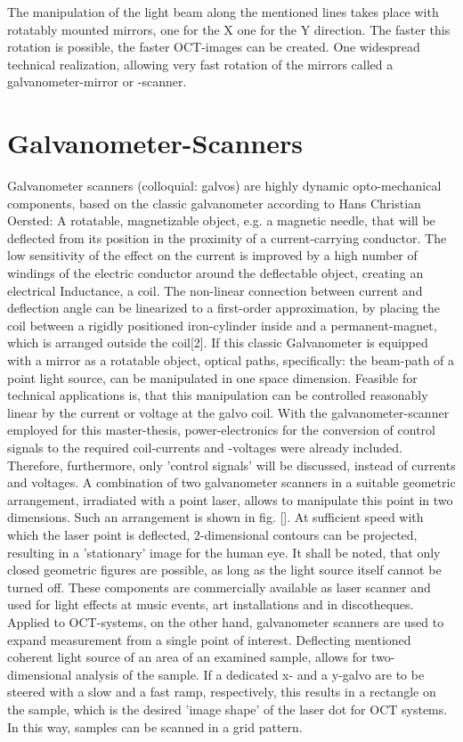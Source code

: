 The manipulation of the light beam along the mentioned lines takes place with rotatably mounted mirrors, one for the X one for the Y direction. The faster this rotation is possible, the faster OCT-images can be created. One widespread technical realization, allowing very fast rotation of the mirrors called a galvanometer-mirror or -scanner.

\section{Galvanometer-Scanners}
Galvanometer scanners (colloquial: galvos) are highly dynamic opto-mechanical components, based on the classic galvanometer according to Hans Christian Oersted: A rotatable, magnetizable object, e.g. a magnetic needle, that will be deflected from its position in the proximity of a current-carrying conductor. The low sensitivity of the effect on the current is improved by a high number of windings of the electric conductor around the deflectable object, creating an electrical Inductance, a coil. The non-linear connection between current and deflection angle can be linearized to a first-order approximation, by placing the coil between a rigidly positioned iron-cylinder inside and a permanent-magnet, which is arranged outside the coil[2]. 
If this classic Galvanometer is equipped with a mirror as a rotatable object, optical paths, specifically: the beam-path of a point light source, can be manipulated in one space dimension. Feasible for technical applications is, that this manipulation can be controlled reasonably linear by the current or voltage at the galvo coil. With the galvanometer-scanner employed for this master-thesis, power-electronics for the conversion of control signals to the required coil-currents and -voltages were already included. Therefore, furthermore, only 'control signals' will be discussed, instead of currents and voltages. A combination of two galvanometer scanners in a suitable geometric arrangement, irradiated with a point laser, allows to manipulate this point in two dimensions. Such an arrangement is shown in fig. []. At sufficient speed with which the laser point is deflected, 2-dimensional contours can be projected, resulting in a 'stationary' image for the human eye. It shall be noted, that only closed geometric figures are possible, as long as the light source itself cannot be turned off. These components are commercially available as laser scanner and used for light effects at music events, art installations and in discotheques. Applied to OCT-systems, on the other hand, galvanometer scanners are used to expand measurement from a single point of interest. Deflecting mentioned coherent light source of an area of an examined sample, allows for two-dimensional analysis of the sample. If a dedicated x- and a y-galvo are to be steered with a slow and a fast ramp, respectively, this results in a rectangle on the sample, which is the desired 'image shape' of the laser dot for OCT systems. In this way, samples can be scanned in a grid pattern.

